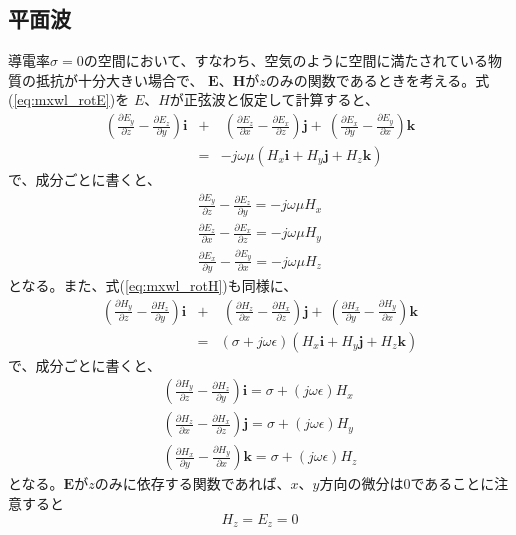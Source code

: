 \subsection*{平面波}
導電率$\sigma=0$の空間において、すなわち、空気のように空間に満たされている物質の抵抗が十分大きい場合で、
$\bm{E}$、$\bm{H}$が$z$のみの関数であるときを考える。式(\ref{eq:mxwl_rotE})を
$E$、$H$が正弦波と仮定して計算すると、
\begin{eqnarray}
(\frac{\partial E_y}{\partial z} - \frac{\partial E_z}{\partial y})\bm{i} &+&\
(\frac{\partial E_z}{\partial x} - \frac{\partial E_x}{\partial z})\bm{j} +\
(\frac{\partial E_x}{\partial y} - \frac{\partial E_y}{\partial x})\bm{k} \nonumber\\
 &=& -j\omega\mu(H_x\bm{i}+H_y\bm{j}+H_z\bm{k}) 
\end{eqnarray}
 で、成分ごとに書くと、
\begin{eqnarray}
\frac{\partial E_y}{\partial z} - \frac{\partial E_z}{\partial y} =- j\omega\mu H_x  \\
\frac{\partial E_z}{\partial x} - \frac{\partial E_x}{\partial z} =- j\omega\mu H_y  \label{eq:plane_waveEzExHy}\\
\frac{\partial E_x}{\partial y} - \frac{\partial E_y}{\partial x} = - j\omega\mu H_z  
\end{eqnarray}
となる。また、式(\ref{eq:mxwl_rotH})も同様に、
\begin{eqnarray}
(\frac{\partial H_y}{\partial z} - \frac{\partial H_z}{\partial y})\bm{i} &+&\
(\frac{\partial H_z}{\partial x} - \frac{\partial H_x}{\partial z})\bm{j} +\
(\frac{\partial H_x}{\partial y} - \frac{\partial H_y}{\partial x})\bm{k} \nonumber \\
&=&(\sigma + j\omega\epsilon)(H_x\bm{i}+H_y\bm{j}+H_z\bm{k})
\end{eqnarray}
で、成分ごとに書くと、
\begin{eqnarray}
(\frac{\partial H_y}{\partial z} - \frac{\partial H_z}{\partial y})\bm{i} = \sigma + (j\omega\epsilon)H_x\\
(\frac{\partial H_z}{\partial x} - \frac{\partial H_x}{\partial z})\bm{j} = \sigma + (j\omega\epsilon)H_y\\
(\frac{\partial H_x}{\partial y} - \frac{\partial H_y}{\partial x})\bm{k} = \sigma + (j\omega\epsilon)H_z
\end{eqnarray}
となる。$\bm{E}$が$z$のみに依存する関数であれば、$x$、$y$方向の微分は$0$であることに注意すると
\begin{equation}
H_z = E_z =0
\end{equation}
